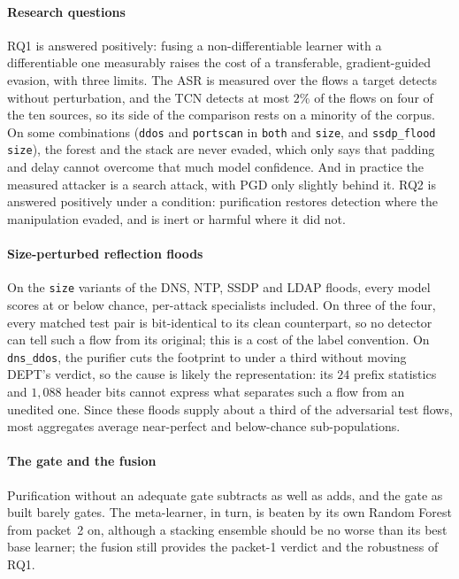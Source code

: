\documentclass[acmtog,nonacm,pbalance]{acmart}
\newcommand{\src}[1]{\texttt{#1}}
\newcommand{\dmode}[1]{\texttt{#1}}
\begin{document}
\paragraph{Research questions} RQ1 is answered positively: fusing a
non-differentiable learner with a differentiable one measurably raises the cost
of a transferable, gradient-guided evasion, with three limits. The ASR is
measured over the flows a target detects without perturbation, and the TCN
detects at most $2\%$ of the flows on four of the ten sources, so its side of
the comparison rests on a minority of the corpus. On some combinations
(\src{ddos} and \src{portscan} in \dmode{both} and \dmode{size}, and
\src{ssdp\_flood} \dmode{size}), the forest and the stack are never evaded,
which only says that padding and delay cannot overcome that much model
confidence. And in practice the measured attacker is a search attack, with PGD
only slightly behind it. RQ2 is answered
positively under a condition: purification restores detection where the
manipulation evaded, and is inert or harmful where it did not.

\paragraph{Size-perturbed reflection floods} On the \dmode{size} variants of the
DNS, NTP, SSDP and LDAP floods, every model scores at or below chance,
per-attack specialists included. On three of the four, every matched test pair
is bit-identical to its clean counterpart, so no detector can tell such a flow from
its original; this
is a cost of the label convention. On \src{dns\_ddos}, the purifier cuts the
footprint to under a third without moving DEPT's verdict, so the cause is likely the
representation: its $24$ prefix statistics and $1{,}088$ header bits cannot
express what separates such a flow from an unedited one. Since these floods
supply about a third of the adversarial test flows, most aggregates average
near-perfect and below-chance sub-populations.

\paragraph{The gate and the fusion} Purification without an adequate gate
subtracts as well as adds, and the gate as built barely gates. The meta-learner,
in turn, is beaten by its own Random Forest from packet~2 on, although a stacking
ensemble should be no worse than its best base learner; the fusion still provides
the packet-1 verdict and the robustness of RQ1.
\end{document}
